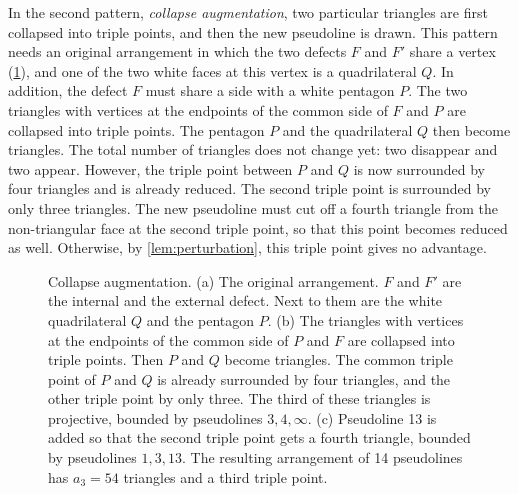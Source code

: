 In the second pattern, \emph{collapse augmentation}, two particular triangles are first collapsed into triple points, and then the new pseudoline is drawn. This pattern needs an original arrangement in which the two defects $F$ and $F'$ share a vertex (\cref{fig:collapse}), and one of the two white faces at this vertex is a quadrilateral $Q$. In addition, the defect $F$ must share a side with a white pentagon $P$. The two triangles with vertices at the endpoints of the common side of $F$ and $P$ are collapsed into triple points. The pentagon $P$ and the quadrilateral $Q$ then become triangles. The total number of triangles does not change yet: two disappear and two appear. However, the triple point between $P$ and $Q$ is now surrounded by four triangles and is already reduced. The second triple point is surrounded by only three triangles. The new pseudoline must cut off a fourth triangle from the non-triangular face at the second triple point, so that this point becomes reduced as well. Otherwise, by \cref{lem:perturbation}, this triple point gives no advantage.

\begin{figure}[p]
\centering
{}
\captionsetup[sub]{skip=-8pt}%
\begin{subfigure}[c]{0.64\linewidth}
\centering

\caption{}
\end{subfigure}\hfill
\begin{subfigure}[c]{0.35\linewidth}%
\centering
\caption{}
\end{subfigure}

\bigskip
\begin{subfigure}[b]{0.64\linewidth}
\centering

\caption{}
\end{subfigure}
\caption{Collapse augmentation. (a) The original arrangement. $F$ and $F'$ are the internal and the external defect. Next to them are the white quadrilateral $Q$ and the pentagon $P$. (b) The triangles with vertices at the endpoints of the common side of $P$ and $F$ are collapsed into triple points. Then $P$ and $Q$ become triangles. The common triple point of $P$ and $Q$ is already surrounded by four triangles, and the other triple point by only three. The third of these triangles is projective, bounded by pseudolines $3,4,\infty$. (c) Pseudoline 13 is added so that the second triple point gets a fourth triangle, bounded by pseudolines $1,3,13$. The resulting arrangement of 14 pseudolines has $a_3=54$ triangles and a third triple point.}
\label{fig:collapse}
\end{figure}

